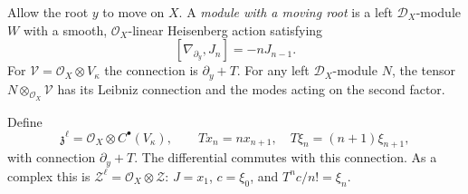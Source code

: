 Allow the root $y$ to move on $X$. A \emph{module with a moving
root} is a left $\mathcal D_X$-module $W$ with a smooth,
$\mathcal O_X$-linear Heisenberg action satisfying
\begin{equation}\label{cbc:rc:moving-relation}
 [\nabla_{\partial_y},J_n]=-nJ_{n-1}.
\end{equation}
For $\mathcal V=\mathcal O_X\otimes V_\kappa$ the connection
is $\partial_y+T$. For any left $\mathcal D_X$-module $N$,
the tensor $N\otimes_{\mathcal O_X}\mathcal V$ has its
Leibniz connection and the modes acting on the second factor.

Define
\[
 \mathfrak z^\ell=\mathcal O_X\otimes C^\bullet(V_\kappa),
 \qquad Tx_n=nx_{n+1},\quad T\xi_n=(n+1)\xi_{n+1},
\]
with connection $\partial_y+T$. The differential commutes
with this connection. As a complex this is
$\mathcal Z^\ell=\mathcal O_X\otimes\mathcal Z$:
$J=x_1$, $c=\xi_0$, and $T^nc/n!=\xi_n$.

